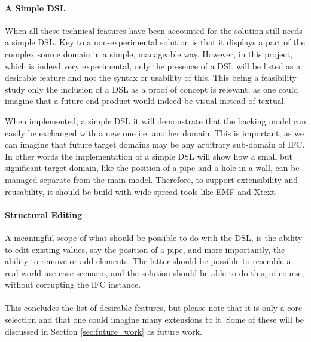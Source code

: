 \paragraph{A Simple DSL}
When all these technical features have been accounted for the solution still needs a simple DSL. Key to a non-experimental solution is that it displays a part of the complex source domain in a simple, manageable way. However, in this project, which is indeed very experimental, only the presence of a DSL will be listed as a desirable feature and not the syntax or usability of this. This being a feasibility study only the inclusion of a DSL as a proof of concept is relevant, as one could imagine that a future end product would indeed be visual instead of textual.

When implemented, a simple DSL it will demonstrate that the backing model can easily be exchanged with a new one i.e. another domain. This is important, as we can imagine that future target domains may be any arbitrary sub-domain of IFC. In other words the implementation of a simple DSL will show how a small but significant target domain, like the position of a pipe and a hole in a wall, can be managed separate from the main model. Therefore, to support extensibility and reusability, it should be build with wide-spread tools like EMF and Xtext.

\paragraph{Structural Editing}
A meaningful scope of what should be possible to do with the DSL, is the ability to edit existing values, say the position of a pipe, and more importantly, the ability to remove or add elements. The latter should be possible to resemble a real-world use case scenario, and the solution should be able to do this, of course, without corrupting the IFC instance.
\paragraph{}
This concludes the list of desirable features, but please note that it is only a core selection and that one could imagine many extensions to it. Some of these will be discussed in Section \ref{sec:future_work} as future work. 

